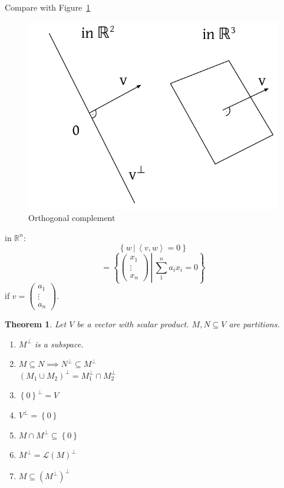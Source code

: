 \documentclass{article}
\newtheorem{theorem}{Theorem}  \numberwithin{theorem}{section}
\newcommand{\set}[1]{\left\{#1\right\}}
\newcommand{\setdef}[2]{\left\{\left.#1\,\right|\,#2\right\}}
\newcommand{\ip}[2]{\left\langle#1,#2\right\rangle} %
\begin{document}
Compare with Figure~\ref{orthocomp}
\begin{figure}[!h]
  \begin{center}
    \includegraphics{img/07_orthogonal_complement.pdf}
    \caption{Orthogonal complement}
    \label{orthocomp}
  \end{center}
\end{figure}

in $\mathbb R^n$:
\[ \setdef{w}{\ip vw = 0} \]
\[ = \setdef{\begin{pmatrix} x_1 \\ \vdots \\ x_n \end{pmatrix}}{\sum_{1}^n a_i x_i = 0} \]
if $v = \begin{pmatrix} a_1 \\ \vdots \\ a_n \end{pmatrix}$.

\begin{theorem} %
  \label{thm841}
  Let $V$ be a vector with scalar product. $M, N \subseteq V$ are partitions.
  \begin{enumerate}
    \item $M^\bot$ is a subspace.
    \item $M \subseteq N \implies N^\bot \subseteq M^\bot$ \\
      $(M_1 \cup M_2)^\bot = M_1^\bot \cap M_2^\bot$
    \item $\set{0}^\bot = V$
    \item $V^\bot = \set{0}$
    \item $M \cap M^\bot \subseteq \set{0}$
    \item $M^\bot = \mathcal L(M)^\bot$
    \item $M \subseteq (M^\bot)^\bot$
  \end{enumerate}
\end{theorem}
\end{document}
